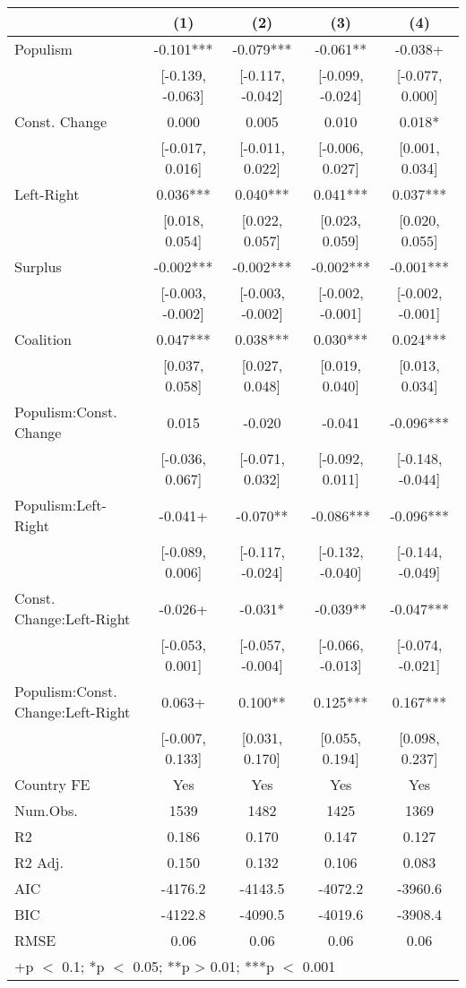 \begin{table}
\centering\centering\centering
\begin{tabular}[t]{lcccc}
\toprule
  & (1) & (2) & (3) & (4)\\
\midrule
Populism & -0.101*** & -0.079*** & -0.061** & -0.038+\\
 & {}[-0.139, -0.063] & {}[-0.117, -0.042] & {}[-0.099, -0.024] & {}[-0.077, 0.000]\\
Const. Change & 0.000 & 0.005 & 0.010 & 0.018*\\
 & {}[-0.017, 0.016] & {}[-0.011, 0.022] & {}[-0.006, 0.027] & {}[0.001, 0.034]\\
Left-Right & 0.036*** & 0.040*** & 0.041*** & 0.037***\\
 & {}[0.018, 0.054] & {}[0.022, 0.057] & {}[0.023, 0.059] & {}[0.020, 0.055]\\
Surplus & -0.002*** & -0.002*** & -0.002*** & -0.001***\\
 & {}[-0.003, -0.002] & {}[-0.003, -0.002] & {}[-0.002, -0.001] & {}[-0.002, -0.001]\\
Coalition & 0.047*** & 0.038*** & 0.030*** & 0.024***\\
 & {}[0.037, 0.058] & {}[0.027, 0.048] & {}[0.019, 0.040] & {}[0.013, 0.034]\\
Populism:Const. Change & 0.015 & -0.020 & -0.041 & -0.096***\\
 & {}[-0.036, 0.067] & {}[-0.071, 0.032] & {}[-0.092, 0.011] & {}[-0.148, -0.044]\\
Populism:Left-Right & -0.041+ & -0.070** & -0.086*** & -0.096***\\
 & {}[-0.089, 0.006] & {}[-0.117, -0.024] & {}[-0.132, -0.040] & {}[-0.144, -0.049]\\
Const. Change:Left-Right & -0.026+ & -0.031* & -0.039** & -0.047***\\
 & {}[-0.053, 0.001] & {}[-0.057, -0.004] & {}[-0.066, -0.013] & {}[-0.074, -0.021]\\
Populism:Const. Change:Left-Right & 0.063+ & 0.100** & 0.125*** & 0.167***\\
 & {}[-0.007, 0.133] & {}[0.031, 0.170] & {}[0.055, 0.194] & {}[0.098, 0.237]\\
\midrule
Country FE & Yes & Yes & Yes & Yes\\
Num.Obs. & 1539 & 1482 & 1425 & 1369\\
R2 & 0.186 & 0.170 & 0.147 & 0.127\\
R2 Adj. & 0.150 & 0.132 & 0.106 & 0.083\\
AIC & -4176.2 & -4143.5 & -4072.2 & -3960.6\\
BIC & -4122.8 & -4090.5 & -4019.6 & -3908.4\\
RMSE & 0.06 & 0.06 & 0.06 & 0.06\\
\bottomrule
\multicolumn{5}{l}{\rule{0pt}{1em}+p $<$ 0.1; *p $<$ 0.05; **p > 0.01; ***p $<$ 0.001}\\
\end{tabular}
\end{table}
